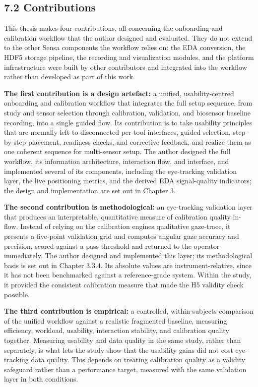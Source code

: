 \documentclass[
]{article}
\begin{document}
\hypertarget{contributions}{%
\subsection{7.2 Contributions}\label{contributions}}

This thesis makes four contributions, all concerning the onboarding and calibration workflow that the author designed and evaluated. They do not extend to the other Sensa components the workflow relies on: the EDA conversion, the HDF5 storage pipeline, the recording and visualization modules, and the platform infrastructure were built by other contributors and integrated into the workflow rather than developed as part of this work.

\textbf{The first contribution is a design artefact:} a unified, usability-centred onboarding and calibration workflow that integrates the full setup sequence, from study and sensor selection through calibration, validation, and biosensor baseline recording, into a single guided flow. Its contribution is to take usability principles that are normally left to disconnected per-tool interfaces, guided selection, step-by-step placement, readiness checks, and corrective feedback, and realize them as one coherent sequence for multi-sensor setup. The author designed the full workflow, its information architecture, interaction flow, and interface, and implemented several of its components, including the eye-tracking validation layer, the live positioning metrics, and the derived EDA signal-quality indicators; the design and implementation are set out in Chapter 3.

\textbf{The second contribution is methodological:} an eye-tracking validation layer that produces an interpretable, quantitative measure of calibration quality in-flow. Instead of relying on the calibration engine\textquotesingle s qualitative gaze-trace, it presents a five-point validation grid and computes angular gaze accuracy and precision, scored against a pass threshold and returned to the operator immediately. The author designed and implemented this layer; its methodological basis is set out in Chapter 3.3.4. Its absolute values are instrument-relative, since it has not been benchmarked against a reference-grade system. Within the study, it provided the consistent calibration measure that made the H5 validity check possible.

\textbf{The third contribution is empirical:} a controlled, within-subjects comparison of the unified workflow against a realistic fragmented baseline, measuring efficiency, workload, usability, interaction stability, and calibration quality together. Measuring usability and data quality in the same study, rather than separately, is what lets the study show that the usability gains did not cost eye-tracking data quality. This depends on treating calibration quality as a validity safeguard rather than a performance target, measured with the same validation layer in both conditions.
\end{document}
